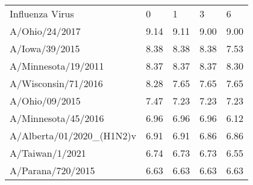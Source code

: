 \begin{tabular}{L{1.95in}|L{.25in}|L{.60in}|L{.6in}|C{1in}}\hline
 Influenza  Virus &0&1&3&6\\
A/Ohio/24/2017&9.14&9.11&9.00&9.00\\
A/Iowa/39/2015&8.38&8.38&8.38&7.53\\
A/Minnesota/19/2011&8.37&8.37&8.37&8.30\\
A/Wisconsin/71/2016&8.28&7.65&7.65&7.65\\
A/Ohio/09/2015&7.47&7.23&7.23&7.23\\
A/Minnesota/45/2016&6.96&6.96&6.96&6.12\\
A/Alberta/01/2020\_(H1N2)v&6.91&6.91&6.86&6.86\\
A/Taiwan/1/2021&6.74&6.73&6.73&6.55\\
A/Parana/720/2015&6.63&6.63&6.63&6.63\\
\hline\end{tabular}
